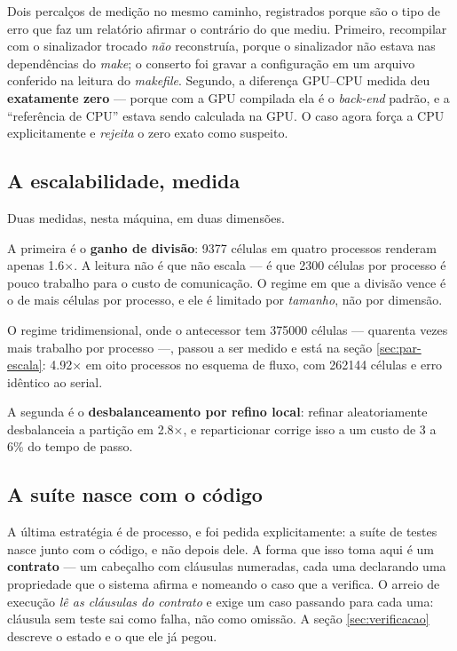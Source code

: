 Dois percalços de medição no mesmo caminho, registrados porque são o tipo de erro
que faz um relatório afirmar o contrário do que mediu. Primeiro, recompilar com o
sinalizador trocado \emph{não} reconstruía, porque o sinalizador não estava nas
dependências do \emph{make}; o conserto foi gravar a configuração em um arquivo
conferido na leitura do \emph{makefile}. Segundo, a diferença GPU--CPU medida deu
\textbf{exatamente zero} --- porque com a GPU compilada ela é o \emph{back-end}
padrão, e a ``referência de CPU'' estava sendo calculada na GPU. O caso agora
força a CPU explicitamente e \emph{rejeita} o zero exato como suspeito.

\subsection{A escalabilidade, medida}
\label{sec:est-escala}

Duas medidas, nesta máquina, em duas dimensões.

A primeira é o \textbf{ganho de divisão}: \num{9377} células em quatro processos
renderam apenas \num{1.6}$\times$. A leitura não é que não escala --- é que
\num{2300} células por processo é pouco trabalho para o custo de comunicação. O
regime em que a divisão vence é o de mais células por processo, e ele é limitado
por \emph{tamanho}, não por dimensão.

O regime tridimensional, onde o antecessor tem \num{375000} células --- quarenta
vezes mais trabalho por processo ---, passou a ser medido e está na seção
\ref{sec:par-escala}: \num{4.92}$\times$ em oito processos no esquema de fluxo,
com \num{262144} células e erro idêntico ao serial.


A segunda é o \textbf{desbalanceamento por refino local}: refinar aleatoriamente
desbalanceia a partição em \num{2.8}$\times$, e reparticionar corrige isso a um
custo de 3 a 6\% do tempo de passo.

\subsection{A suíte nasce com o código}

A última estratégia é de processo, e foi pedida explicitamente: a suíte de testes
nasce junto com o código, e não depois dele. A forma que isso toma aqui é um
\textbf{contrato} --- um cabeçalho com cláusulas numeradas, cada uma declarando
uma propriedade que o sistema afirma e nomeando o caso que a verifica. O arreio
de execução \emph{lê as cláusulas do contrato} e exige um caso passando para cada
uma: cláusula sem teste sai como falha, não como omissão. A seção
\ref{sec:verificacao} descreve o estado e o que ele já pegou.
